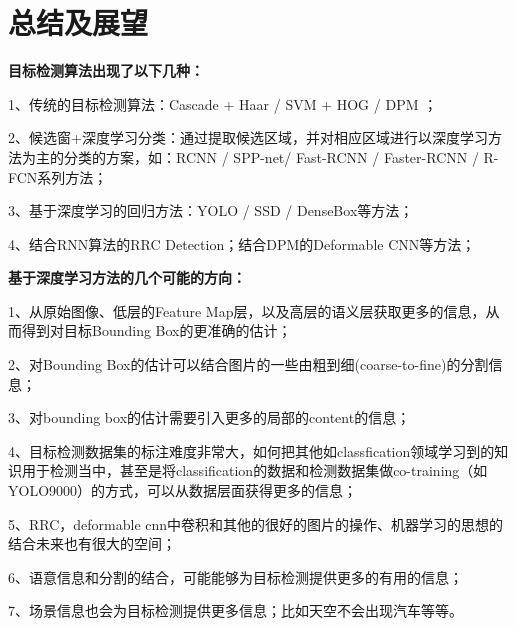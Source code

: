 \section{总结及展望}
\setcounter{figure}{0}
\textbf{目标检测算法出现了以下几种：}

1、传统的目标检测算法：Cascade\cite{repid} + Haar\cite{haar} / SVM\cite{svm} + HOG / DPM ；

2、候选窗+深度学习分类：通过提取候选区域，并对相应区域进行以深度学习方法为主的分类的方案，如：RCNN / SPP-net/ Fast-RCNN / Faster-RCNN  / R-FCN\cite{rfcn}系列方法；

3、基于深度学习的回归方法：YOLO / SSD / DenseBox\cite{densebox}等方法；

4、结合RNN算法的RRC Detection；结合DPM的Deformable CNN\cite{deformable}等方法；

\textbf{基于深度学习方法的几个可能的方向：}

1、从原始图像、低层的Feature Map层，以及高层的语义层获取更多的信息，从而得到对目标Bounding Box的更准确的估计；

2、对Bounding Box的估计可以结合图片的一些由粗到细(coarse-to-fine)的分割信息；

3、对bounding box的估计需要引入更多的局部的content的信息；

4、目标检测数据集的标注难度非常大，如何把其他如classfication领域学习到的知识用于检测当中，甚至是将classification的数据和检测数据集做co-training（如YOLO9000）的方式，可以从数据层面获得更多的信息；

5、RRC，deformable cnn中卷积和其他的很好的图片的操作、机器学习的思想的结合未来也有很大的空间；

6、语意信息和分割的结合，可能能够为目标检测提供更多的有用的信息；

7、场景信息也会为目标检测提供更多信息；比如天空不会出现汽车等等。